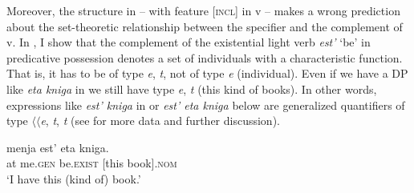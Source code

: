 \documentclass[output=paper,colorlinks,citecolor=brown,nonflat]{./langscibook}
\begin{document}
Moreover, the structure in  – with feature [\textsc{incl}] in v – makes a wrong prediction about the set-theoretic relationship between the specifier and the complement of v. In \citet{TsedrykInPress}, I show that the complement of the existential light verb \textit{est’} ‘be’ in predicative possession denotes a set of individuals with a characteristic function. That is, it has to be of type {\textlangle}\textit{e}, \textit{t}{\textrangle}, not of type {\textlangle}\textit{e}{\textrangle} (individual). Even if we have a DP like \textit{eta kniga} in  we still have type {\textlangle}\textit{e}, \textit{t}{\textrangle} (this kind of books). In other words, expressions like \textit{est’ kniga} in  or \textit{est’ eta kniga} below are generalized quantifiers of type ${\langle}{\langle}$\textit{e}, \textit{t}{\textrangle}, \textit{t}{\textrangle} (see \citealt{TsedrykInPress} for more data and further discussion). 

\ea%
    \label{ex:tsedryk:9}
     {menja}     {est’}           {eta} {kniga.}\\
            at me.\textsc{gen}   be.\textsc{exist}   [this book].\textsc{nom}\\
    \glt    ‘I have this (kind of) book.’
    \z
\end{document}
